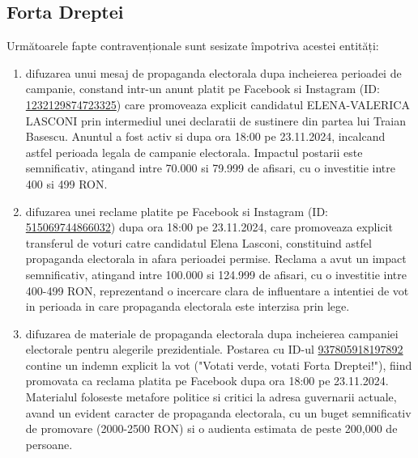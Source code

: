\documentclass[a4paper,12pt]{article}
\begin{document}
\vspace{0.5cm}

\subsection{Forta Dreptei}
Următoarele fapte contravenționale sunt sesizate împotriva acestei entități:

\begin{enumerate}[leftmargin=*, label=\arabic*.)]
    \item difuzarea unui mesaj de propaganda electorala dupa incheierea perioadei de campanie, constand intr-un anunt platit pe Facebook si Instagram (ID: \href{https://www.facebook.com/ads/library/?id=1232129874723325}{1232129874723325}) care promoveaza explicit candidatul ELENA-VALERICA LASCONI prin intermediul unei declaratii de sustinere din partea lui Traian Basescu. Anuntul a fost activ si dupa ora 18:00 pe 23.11.2024, incalcand astfel perioada legala de campanie electorala. Impactul postarii este semnificativ, atingand intre 70.000 si 79.999 de afisari, cu o investitie intre 400 si 499 RON.
    \item difuzarea unei reclame platite pe Facebook si Instagram (ID: \href{https://www.facebook.com/ads/library/?id=515069744866032}{515069744866032}) dupa ora 18:00 pe 23.11.2024, care promoveaza explicit transferul de voturi catre candidatul Elena Lasconi, constituind astfel propaganda electorala in afara perioadei permise. Reclama a avut un impact semnificativ, atingand intre 100.000 si 124.999 de afisari, cu o investitie intre 400-499 RON, reprezentand o incercare clara de influentare a intentiei de vot in perioada in care propaganda electorala este interzisa prin lege.
    \item difuzarea de materiale de propaganda electorala dupa incheierea campaniei electorale pentru alegerile prezidentiale. Postarea cu ID-ul \href{https://www.facebook.com/ads/library/?id=937805918197892}{937805918197892} contine un indemn explicit la vot ("Votati verde, votati Forta Dreptei!"), fiind promovata ca reclama platita pe Facebook dupa ora 18:00 pe 23.11.2024. Materialul foloseste metafore politice si critici la adresa guvernarii actuale, avand un evident caracter de propaganda electorala, cu un buget semnificativ de promovare (2000-2500 RON) si o audienta estimata de peste 200,000 de persoane.
\end{enumerate}

\vspace{0.5cm}
\end{document}
